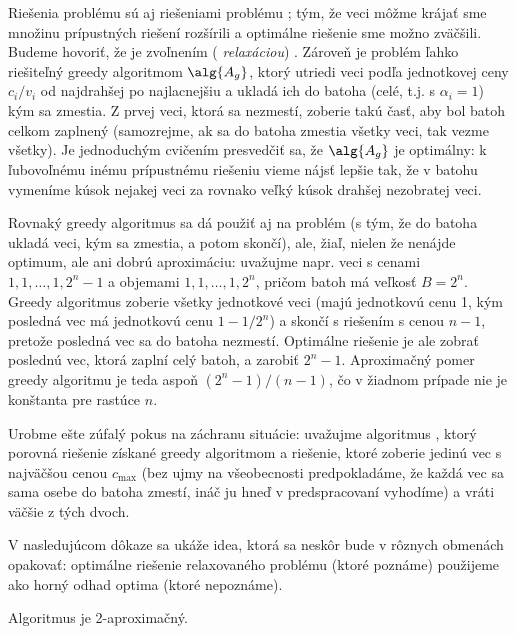 \noindent Riešenia problému \knapsack sú aj riešeniami problému \Qknapsack;
tým, že veci môžme krájať sme množinu prípustných riešení rozšírili a optimálne
riešenie sme možno zväčšili. Budeme hovoriť, že \Qknapsack je zvoľnením ({\em
relaxáciou}) \knapsack. Zároveň je problém \Qknapsack ľahko riešiteľný greedy
algoritmom $\alg{A_g}$, ktorý utriedi veci podľa jednotkovej ceny $c_i/v_i$ od
najdrahšej po najlacnejšiu a ukladá ich do batoha (celé, t.j. s $\alpha_i=1$)
kým sa zmestia. Z prvej veci, ktorá sa nezmestí, zoberie takú časť, aby bol
batoh celkom zaplnený (samozrejme, ak sa do batoha zmestia všetky veci, tak
vezme všetky). Je jednoduchým cvičením presvedčiť sa, že $\alg{A_g}$ je
optimálny: k ľubovoľnému inému prípustnému riešeniu vieme nájsť lepšie tak, že
v batohu vymeníme kúsok nejakej veci za rovnako veľký kúsok drahšej nezobratej
veci.

Rovnaký greedy algoritmus sa dá použiť aj na problém \knapsack (s tým, že do
batoha ukladá veci, kým sa zmestia, a potom skončí), ale, žiaľ, nielen že
nenájde optimum, ale ani dobrú aproximáciu: uvažujme napr. veci s cenami
$1,1,\ldots,1,2^n-1$ a objemami $1,1,\ldots,1,2^n$, pričom batoh má veľkosť
$B=2^n$. Greedy algoritmus zoberie všetky jednotkové veci (majú jednotkovú cenu
1, kým posledná vec má jednotkovú cenu $1-1/2^n$) a skončí s riešením s cenou
$n-1$, pretože posledná vec sa do batoha nezmestí.  Optimálne riešenie je ale
zobrať poslednú vec, ktorá zaplní celý batoh, a zarobiť $2^n-1$. Aproximačný
pomer greedy algoritmu je teda aspoň $(2^n-1)/(n-1)$, čo v žiadnom prípade nie
je konštanta pre rastúce $n$.

Urobme ešte zúfalý pokus na záchranu situácie: uvažujme algoritmus \algA, ktorý
porovná riešenie získané greedy algoritmom a riešenie, ktoré zoberie jedinú vec
s najväčšou cenou $c_{\max}$ (bez ujmy na všeobecnosti predpokladáme, že každá
vec sa sama osebe do batoha zmestí, ináč ju hneď v predspracovaní vyhodíme) a
vráti väčšie z tých dvoch. 

V nasledujúcom dôkaze sa ukáže idea, ktorá sa neskôr bude v rôznych obmenách opakovať:
optimálne riešenie relaxovaného problému (ktoré poznáme) použijeme ako horný odhad optima (ktoré nepoznáme).

\begin{veta}
  Algoritmus \algA je 2-aproximačný.
\end{veta}

